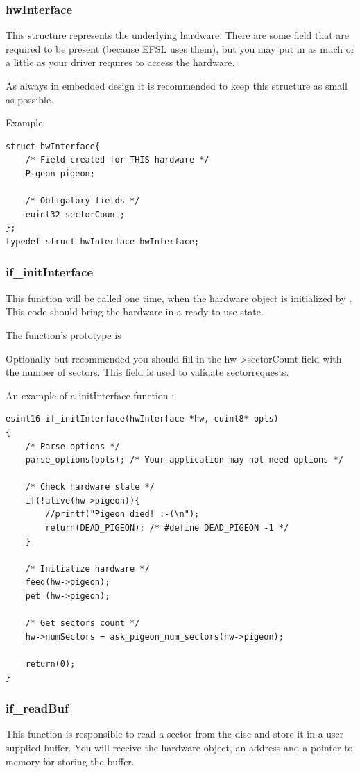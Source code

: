 \subsubsection{hwInterface}
This structure represents the underlying hardware. There are some field that are required
to be present (because EFSL uses them), but you may put in as much or a little as
your driver requires to access the hardware.

As always in embedded design it is recommended to keep this structure as small
as possible.

Example:
\begin{lstlisting}
struct hwInterface{
	/* Field created for THIS hardware */
	Pigeon pigeon;

	/* Obligatory fields */
	euint32 sectorCount;
};
typedef struct hwInterface hwInterface;
\end{lstlisting}

\subsubsection{if\_initInterface}
This function will be called one time, when the hardware object is initialized by
. This code should bring the hardware in a ready to use state.

The function's prototype is\\

Optionally but recommended you should fill in the hw->sectorCount field with the number
of sectors. This field is used to validate sectorrequests.

An example of a initInterface function :
\begin{lstlisting}
esint16 if_initInterface(hwInterface *hw, euint8* opts)
{
	/* Parse options */
	parse_options(opts); /* Your application may not need options */

	/* Check hardware state */
	if(!alive(hw->pigeon)){
		//printf("Pigeon died! :-(\n");
		return(DEAD_PIGEON); /* #define DEAD_PIGEON -1 */
	}

	/* Initialize hardware */
	feed(hw->pigeon);
	pet (hw->pigeon);

	/* Get sectors count */
	hw->numSectors = ask_pigeon_num_sectors(hw->pigeon);

	return(0);
}
\end{lstlisting}

\subsubsection{if\_readBuf}
This function is responsible to read a sector from the disc and store it in a user supplied buffer. You will receive the hardware object, an address and a pointer to memory for storing
the buffer.

